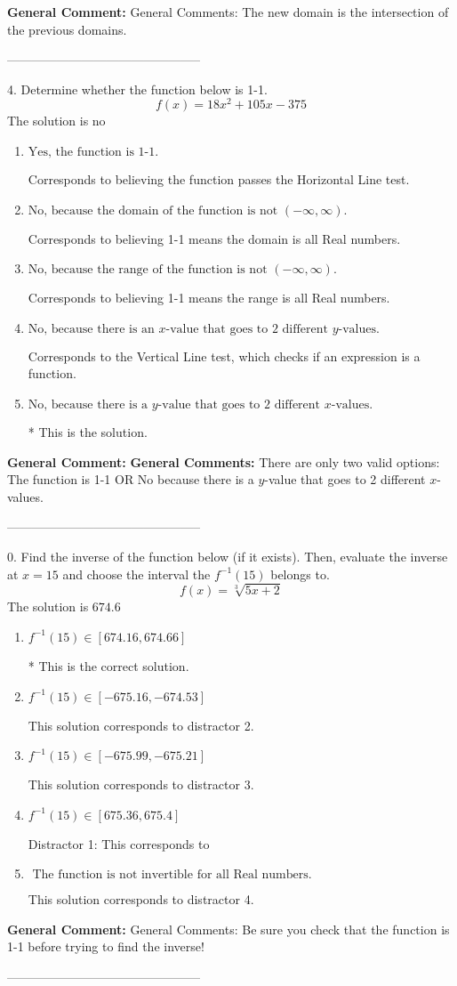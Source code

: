 \documentclass{extbook}[14pt]
\begin{document}
\textbf{General Comment:} General Comments: The new domain is the intersection of the previous domains. 

-----------------------------------------------

4. Determine whether the function below is 1-1.
\[ f(x) = 18 x^2 + 105 x - 375 \] 
The solution is $ \text{no} $ 

\begin{enumerate}[label=\Alph*.] 
\item $ \text{Yes, the function is 1-1.} $ 

 Corresponds to believing the function passes the Horizontal Line test. 
\item $ \text{No, because the domain of the function is not $(-\infty, \infty)$.} $ 

 Corresponds to believing 1-1 means the domain is all Real numbers. 
\item $ \text{No, because the range of the function is not $(-\infty, \infty)$.} $ 

 Corresponds to believing 1-1 means the range is all Real numbers. 
\item $ \text{No, because there is an $x$-value that goes to 2 different $y$-values.} $ 

 Corresponds to the Vertical Line test, which checks if an expression is a function. 
\item $ \text{No, because there is a $y$-value that goes to 2 different $x$-values.} $ 

 * This is the solution. 
\end{enumerate} 
 
\textbf{General Comment:} \textbf{General Comments:} There are only two valid options: The function is 1-1 OR No because there is a $y$-value that goes to 2 different $x$-values. 

-----------------------------------------------

0. Find the inverse of the function below (if it exists). Then, evaluate the inverse at $x = 15$ and choose the interval the $f^{-1}(15)$ belongs to.
\[ f(x) = \sqrt[3]{5 x + 2} \] 
The solution is $ 674.6 $ 

\begin{enumerate}[label=\Alph*.] 
\item $ f^{-1}(15) \in [674.16, 674.66] $ 

 * This is the correct solution. 
\item $ f^{-1}(15) \in [-675.16, -674.53] $ 

  This solution corresponds to distractor 2. 
\item $ f^{-1}(15) \in [-675.99, -675.21] $ 

  This solution corresponds to distractor 3. 
\item $ f^{-1}(15) \in [675.36, 675.4] $ 

  Distractor 1: This corresponds to  
\item $ \text{ The function is not invertible for all Real numbers. } $ 

  This solution corresponds to distractor 4. 
\end{enumerate} 
 
\textbf{General Comment:} General Comments: Be sure you check that the function is 1-1 before trying to find the inverse! 

-----------------------------------------------
\end{document}
